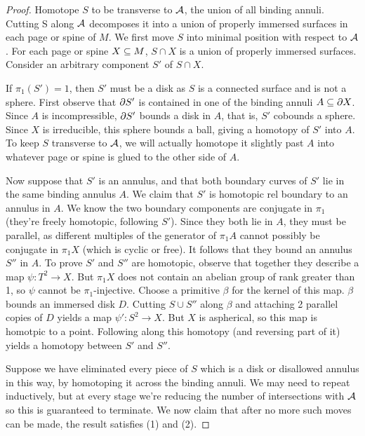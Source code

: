 \begin{proof}

Homotope $S$ to be transverse to $\mathcal{A}$, the union of all binding annuli.
Cutting S along $\mathcal{A}$ decomposes it into a union of properly immersed surfaces
in each page or spine of $M$. We first move $S$ into minimal position with
respect to $\mathcal{A}$.  For each page or spine $X \subseteq M$, $S \cap X$ is a union of
properly immersed surfaces. Consider an arbitrary component $S'$ of $S \cap X$.

If $\pi_1(S')=1$, then $S'$ must be a disk as $S$ is a connected surface and is
not a sphere. First observe that $\partial S'$ is contained in one of the binding
annuli $A \subseteq \partial X$. Since $A$ is incompressible, $\partial S'$ bounds a disk in
$A$, that is, $S'$ cobounds a sphere. Since $X$ is irreducible, this sphere
bounds a ball, giving a homotopy of $S'$ into $A$. To keep $S$ transverse to
$\mathcal{A}$, we will actually homotope it slightly past $A$ into whatever page or
spine is glued to the other side of $A$.

Now suppose that $S'$ is an annulus, and that both boundary curves of $S'$ lie
in the same binding annulus $A$. We claim that $S'$ is homotopic rel boundary
to an annulus in $A$. We know the two boundary components are conjugate in
$\pi_1$ (they're freely homotopic, following $S'$). Since they both lie in $A$,
they must be parallel, as different multiples of the generator of $\pi_1A$
cannot possibly be conjugate in $\pi_1X$ (which is cyclic or free). It follows
that they bound an annulus $S''$ in $A$.  To prove $S'$ and $S''$ are
homotopic, observe that together they describe a map $\psi\colon T^2 \to X$.
But $\pi_1X$ does not contain an abelian group of rank greater than 1, so
$\psi$ cannot be $\pi_1$-injective.  Choose a primitive $\beta$ for the kernel
of this map. $\beta$ bounds an immersed disk $D$.  Cutting $S \cup S''$ along
$\beta$ and attaching 2 parallel copies of $D$ yields a map $\psi'\colon S^2
\to X$.  But $X$ is aspherical, so this map is homotpic to a point. Following
along this homotopy (and reversing part of it) yields a homotopy between $S'$
and $S''$.

Suppose we have eliminated every piece of $S$ which is a disk or disallowed
annulus in this way, by homotoping it across the binding annuli. We may need to
repeat inductively, but at every stage we're reducing the number of
intersections with $\mathcal{A}$ so this is guaranteed to terminate. We now claim that
after no more such moves can be made, the result satisfies (1) and (2).


\end{proof}

